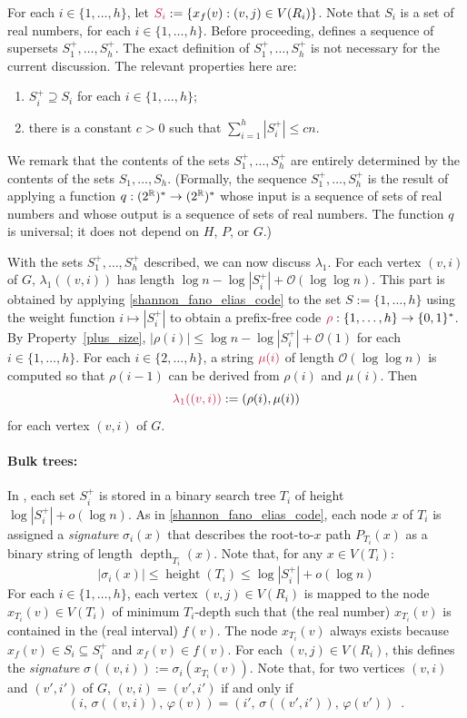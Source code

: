 \documentclass{patmorin}
\makeatletter
\renewcommand{\le}{\leqslant}
\DeclareMathOperator{\height}{height}
\DeclareMathOperator{\depth}{depth}
\newcommand{\defin}[1]{\emph{\textcolor{brightmaroon}{#1}}}
\def\mathcolor#1#{\@mathcolor{#1}}
\def\@mathcolor#1#2#3{%
  \protect\leavevmode
  \begingroup
    \color#1{#2}#3%
  \endgroup
}
\newcommand{\mathdefin}[1]{\mathcolor{brightmaroon}{#1}}
\newcommand{\Oh}{\calO}
\newcommand{\calO}{\mathcal{O}}
\makeatother
\begin{document}
  For each $i\in\{1,\ldots,h\}$, let $\mathdefin{S_i}:=\{x_f(v):(v,j)\in V(R_i)\}$.
  Note that $S_i$ is a set of real numbers, for each $i\in\{1,\ldots,h\}$.
  Before proceeding, \cite{dujmovic.esperet.ea:adjacency} defines a sequence of supersets \defin{$S^+_1,\ldots,S^+_h$}. The exact definition of $S^+_1,\ldots,S^+_h$ is not necessary for the current discussion.
  The relevant properties here are:
  \begin{enumerate}[label=(\alph*)]
      \item\label{plus_superset} $S^+_i\supseteq S_i$ for each $i\in\{1,\ldots,h\}$;
      \item\label{plus_size} there is a constant $c>0$ such that $\sum_{i=1}^h |S^+_i|\le cn$.
  \end{enumerate}
  We remark that the contents of the sets $S^+_1,\ldots,S^+_h$ are entirely determined by the contents of the sets $S_1,\ldots,S_h$.
  (Formally, the sequence $S^+_1,\ldots,S^+_h$ is the result of applying a function $q:(2^{\mathbb{R}})^*\to (2^{\mathbb{R}})^*$ whose input is a sequence of sets of real numbers and whose output is a sequence of sets of real numbers. The function $q$ is universal; it does not depend on $H$, $P$, or $G$.)

  With the sets $S^+_1,\ldots,S^+_h$ described, we can now discuss $\lambda_1$.
  For each vertex $(v,i)$ of $G$, $\lambda_1((v,i))$ has length $\log n - \log |S^+_i| + \Oh(\log\log n)$.
  This part is obtained by applying \cref{shannon_fano_elias_code} to the set $S:=\{1,\ldots,h\}$ using the weight function $i \mapsto |S^+_i|$ to obtain a prefix-free code $\mathdefin{\rho}:\{1,\ldots,h\}\to\{0,1\}^*$.
  By Property~\ref{plus_size}, $|\rho(i)|\le \log n - \log|S^+_i| + \Oh(1)$ for each $i\in\{1,\ldots,h\}$.
  For each $i\in\{2,\ldots,h\}$, a string $\mathdefin{\mu(i)}$ of length $\Oh(\log\log n)$ is computed so that $\rho(i-1)$ can be derived from $\rho(i)$ and $\mu(i)$.
  Then
  \[
     \mathdefin{\lambda_1((v,i))}:=(\rho(i),\mu(i))
  \]
  for each vertex $(v,i)$ of $G$.

  \paragraph{Bulk trees:}
  In \cite{dujmovic.esperet.ea:adjacency}, each set $S^+_i$ is stored in a binary search tree $T_i$ of height $\log|S^+_i|+o(\log n)$.
  As in \cref{shannon_fano_elias_code}, each node $x$ of $T_i$ is assigned a \defin{signature} \defin{$\sigma_i(x)$} that describes the root-to-$x$ path $P_{T_i}(x)$ as a binary string of length $\depth_{T_i}(x)$.
  Note that, for any $x\in V(T_i)$:
  \[
    |\sigma_i(x)| \le \height(T_i) \le \log|S^+_i|+o(\log n)
  \]
  For each $i\in\{1,\ldots,h\}$, each vertex $(v,j)\in V(R_i)$ is mapped to the node $x_{T_i}(v)\in V(T_i)$ of minimum $T_i$-depth such that (the real number) $x_{T_i}(v)$ is contained in the (real interval) $f(v)$.
  The node $x_{T_i}(v)$ always exists because $x_f(v)\in S_i\subseteq S_i^+$ and $x_f(v)\in f(v)$.
  For each $(v,j)\in V(R_i)$, this defines the \defin{signature} $\sigma((v,i)):=\sigma_i(x_{T_i}(v))$.  Note that, for two vertices $(v,i)$ and $(v',i')$ of $G$, $(v,i)=(v',i')$ if and only if
  \[
     (i,\,\sigma((v,i)),\,\varphi(v)) = (i',\,\sigma((v',i')),\,\varphi(v')) \enspace .
  \]
\end{document}
